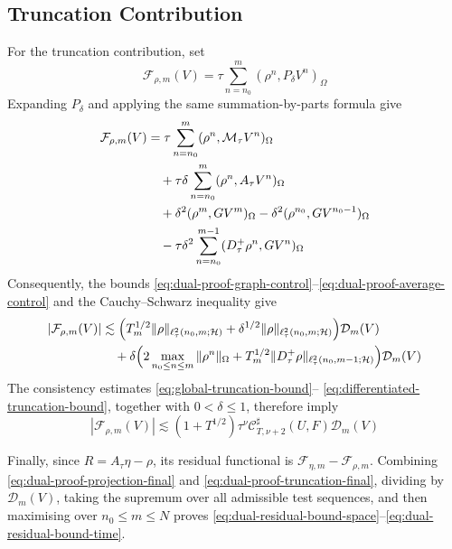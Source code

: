 \documentclass[11pt]{article}
\begin{document}
\subsection{Truncation Contribution}
\label{subsec:dual-proof-truncation}
For the truncation contribution, set
\begin{equation}
\mathcal F_{\rho,m}(V)
=\tau\sum_{n=n_0}^{m}(\rho^n,P_{\delta}V^n)_{\Omega} \label{eq:dual-proof-truncation-functional}
\end{equation}
Expanding \(P_{\delta}\) and applying the same summation-by-parts formula give
\begin{align}
\mathcal F_{\rho,m}(V)
&=\tau\sum_{n=n_0}^{m}(\rho^n,\mathcal M_{\tau}V^n)_{\Omega} \label{eq:dual-proof-truncation-functional-main}\\
&\quad+\tau\delta\sum_{n=n_0}^{m}(\rho^n,A_{\tau}V^n)_{\Omega} \notag\\
&\quad+\delta^2(\rho^m,GV^m)_{\Omega}
-\delta^2(\rho^{n_0},GV^{n_0-1})_{\Omega} \notag\\
&\quad-\tau\delta^2\sum_{n=n_0}^{m-1}
(D_{\tau}^{+}\rho^n,GV^n)_{\Omega} \label{eq:dual-proof-truncation-functional-sbp}
\end{align}
Consequently, the bounds
\eqref{eq:dual-proof-graph-control}--\eqref{eq:dual-proof-average-control} and
the Cauchy--Schwarz inequality give
\begin{align}
|\mathcal F_{\rho,m}(V)|
&\lesssim\Bigl(
T_m^{1/2}\|\rho\|_{\ell_{\tau}^2(n_0,m;\mathcal H)}
+\delta^{1/2}\|\rho\|_{\ell_{\tau}^2(n_0,m;\mathcal H)}\Bigr)
\mathcal D_m(V) \label{eq:dual-proof-truncation-functional-bound-main}\\
&\quad+\delta\Bigl(
2\max_{n_0\le n\le m}\|\rho^n\|_{\Omega}
+T_m^{1/2}\|D_{\tau}^{+}\rho\|_{
\ell_{\tau}^2(n_0,m-1;\mathcal H)}\Bigr)\mathcal D_m(V) \label{eq:dual-proof-truncation-functional-bound-sbp}
\end{align}
The consistency estimates \eqref{eq:global-truncation-bound}--
\eqref{eq:differentiated-truncation-bound}, together with
\(0<\delta\le1\), therefore imply
\begin{equation}
|\mathcal F_{\rho,m}(V)|
\lesssim(1+T^{1/2})\tau^\nu
\mathcal C^{\sharp}_{T,\nu+2}(U,F)\mathcal D_m(V) \label{eq:dual-proof-truncation-final}
\end{equation}

Finally, since \(R=A_{\tau}\eta-\rho\), its residual functional is
\(\mathcal F_{\eta,m}-\mathcal F_{\rho,m}\). Combining
\eqref{eq:dual-proof-projection-final} and
\eqref{eq:dual-proof-truncation-final}, dividing by
\(\mathcal D_m(V)\), taking the supremum over all admissible test sequences,
and then maximising over \(n_0\le m\le N\) proves
\eqref{eq:dual-residual-bound-space}--\eqref{eq:dual-residual-bound-time}.
\end{document}
